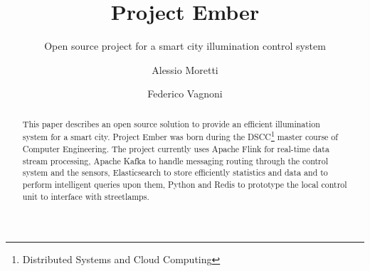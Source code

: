 \documentclass[sigconf, authordraft]{acmart}
\begin{document}
\title{Project Ember}
\subtitle{Open source project for a smart city illumination control system}

\author{Alessio Moretti}

\author{Federico Vagnoni}


\begin{abstract}
	This paper describes an open source solution to provide an efficient illumination system for a smart city. Project Ember was born during the DSCC\footnote{Distributed Systems and Cloud Computing} master course of Computer Engineering. The project currently uses Apache Flink for real-time data stream processing, Apache Kafka to handle messaging routing through the control system and the sensors, Elasticsearch to store efficiently statistics and data and to perform intelligent queries upon them, Python and Redis to prototype the local control unit to interface with streetlamps.
\end{abstract}


	
\maketitle
	


\nocite{*}


\end{document}
